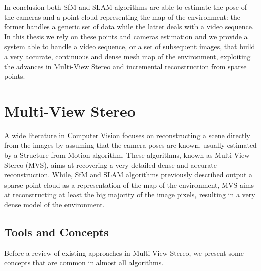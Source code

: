
In conclusion both SfM and SLAM algorithms are able to estimate the pose of the cameras and a point cloud representing the map of the environment: the former handles a generic set of data while the latter deals with a video sequence. 
In this thesis we rely on these points and cameras estimation and we provide a system able to handle a video sequence, or a set of subsequent images, that build a very accurate, continuous and dense mesh map of the environment, exploiting the advances in Multi-View Stereo and incremental reconstruction from sparse points.

\section{Multi-View Stereo}


A wide literature in Computer Vision focuses on reconstructing a scene directly from the images by assuming that the camera poses are known, usually estimated by a Structure from Motion algorithm.
These algorithms, known as Multi-View Stereo (MVS), aims at recovering a very detailed dense and accurate reconstruction. 
While, SfM and SLAM algorithms previously described output a sparse point cloud as a representation of the map of the environment, MVS aims at reconstructing at least the big majority of the image pixels, resulting in a very dense model of the environment.

\subsection{Tools and Concepts}
Before a review of existing approaches  in Multi-View Stereo, we present some concepts that are common in almost all algorithms.
